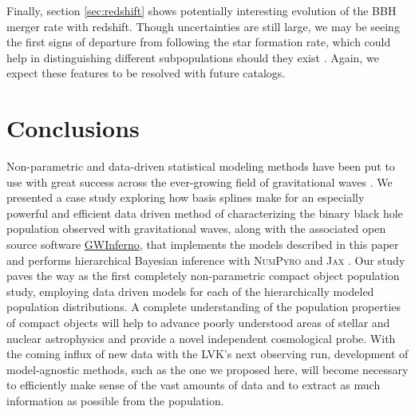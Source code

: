 Finally, section \ref{sec:redshift} shows potentially interesting evolution of the BBH merger rate with redshift.  Though uncertainties are still large, we may be seeing the first signs of departure from following the star formation rate, which could help in distinguishing different subpopulations should they exist \citep{van_Son_2022}.  Again, we expect these features to be resolved with future catalogs.

\section{Conclusions}\label{sec:conclusion}

Non-parametric and data-driven statistical modeling methods have been put to use with great success across the ever-growing field of gravitational 
waves \citep{B_Farr_etal_2014,Littenberg_2015,Mandel_2016,Edwards_2018,Doctor_GPR,Edelman_2021,Vitale_2021,Tiwari_2021_a,Tiwari_2021_b,Edelman_2022ApJ,Tiwari_2022ApJ,ModelExploration_MaxPopLike}. 
We presented a case study exploring how basis splines make for an especially powerful and efficient data driven method of characterizing the binary black hole population observed 
with gravitational waves, along with the associated open source software \href{https://git.ligo.org/bruce.edelman/gwinferno}{GWInferno}, that implements the models 
described in this paper and performs hierarchical Bayesian inference with \textsc{NumPyro} and \textsc{Jax} \citep{pyro,numpyro,jax}. 
Our study paves the way as the first completely non-parametric compact object population study, employing data driven models for each of the hierarchically 
modeled population distributions. A complete understanding of the population properties of compact objects will help to advance poorly understood areas of stellar and 
nuclear astrophysics and provide a novel independent cosmological probe. With the coming influx of new data with the LVK's next observing run, development of model-agnostic methods, such as the one we proposed here, will become necessary to efficiently make
sense of the vast amounts of data and to extract as much information as possible from the population. 